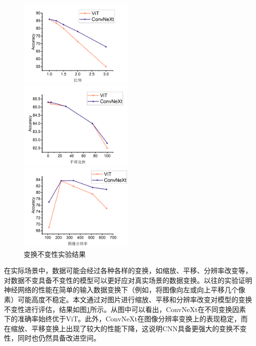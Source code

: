 \begin{figure}[H]
    \begin{minipage}[t]{0.33\linewidth}
	\centering
	\includegraphics[width=2.2in]{pics/比例.png}
    \end{minipage}
    \begin{minipage}[t]{0.33\linewidth}
	\centering
	\includegraphics[width=2.2in]{pics/平移比例.png}
    \end{minipage}
    \begin{minipage}[t]{0.33\linewidth}
	\centering
	\includegraphics[width=2.2in]{pics/分辨率.png}
    \end{minipage}
    \caption{变换不变性实验结果}
    \label{fig:invariance}
\end{figure}

在实际场景中，数据可能会经过各种各样的变换，如缩放、平移、分辨率改变等，对数据不变具备不变性的模型可以更好应对真实场景的数据变换。以往的实验\cite{azulay2019deep}证明神经网络的性能在简单的输入数据变换下（例如，将图像向左或向上平移几个像素）可能高度不稳定。本文通过对图片进行缩放、平移和分辨率改变对模型的变换不变性进行评估，结果如图\ref{fig:invariance}所示。从图中可以看出，ConvNeXt在不同变换因素下的准确率始终优于ViT。此外，ConvNeXt在图像分辨率变换上的表现稳定，而在缩放、平移变换上出现了较大的性能下降，这说明CNN具备更强大的变换不变性，同时也仍然具备改进空间。

